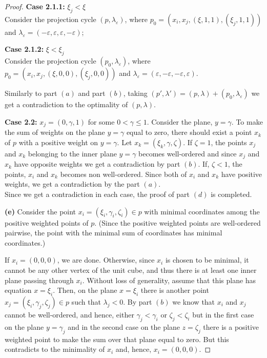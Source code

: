 \documentclass[10pt,a4paper]{amsart}
\begin{document}
\begin{proof}
    \textbf{Case 2.1.1:} \(\xi_j < \xi\)\\
    Consider the projection cycle \((p, \lambda_\varepsilon)\), where \(p_0=(x_i, x_j, (\xi,1,1), (\xi_j,1,1))\) and \(\lambda_\varepsilon=(-\varepsilon,\varepsilon,\varepsilon,-\varepsilon)\);
    
    \textbf{Case 2.1.2:} \(\xi < \xi_j\)\\
    Consider the projection cycle \((p_0, \lambda_\varepsilon)\), where \(p_0=(x_i, x_j, (\xi,0,0), (\xi_j,0,0))\) and \(\lambda_\varepsilon=(\varepsilon,-\varepsilon,-\varepsilon,\varepsilon)\).

    Similarly to part \((a)\) and part \((b)\), taking \((p',\lambda')=(p,\lambda)+(p_0,\lambda_\varepsilon)\) we get a contradiction to the optimality of \((p,\lambda)\).
    
    \textbf{Case 2.2:} \(x_j=(0,\gamma,1)\) for some \(0 < \gamma \le 1\). 
    Consider the plane, \(y=\gamma\). To make the sum of weights on the plane \(y=\gamma\) equal to zero, there should exist a point \(x_k\) of \(p\) with a positive weight on \(y=\gamma\). Let \(x_k=(\xi_k,\gamma,\zeta)\). If \(\zeta=1\), the points \(x_j\) and \(x_k\) belonging to the inner plane \(y=\gamma\) becomes well-ordered and since \(x_j\) and \(x_k\) have opposite weights we get a contradiction by part \((b)\). If, \(\zeta<1\), the points, \(x_i\) and \(x_k\) becomes non well-ordered. Since both of \(x_i\) and \(x_k\) have positive weights, we get a contradiction by the part \((a)\).
    \\
    Since we get a contradiction in each case, the proof of part \((d)\) is completed.


\textbf{(e)} 
    Consider the point \(x_i=(\xi_i,\gamma_i,\zeta_i)\in p\) with minimal coordinates among the positive weighted points of \(p\). (Since the positive weighted points are well-ordered pairwise, the point with the minimal sum of coordinates has minimal coordinates.) 
    
    If \(x_i=(0,0,0)\), we are done. Otherwise, since \(x_i\) is chosen to be minimal, it cannot be any other vertex of the unit cube, and thus there is at least one inner plane passing through \(x_i\). 
    Without loss of generality, assume that this plane has equation \(x=\xi_i\). Then, on the plane \(x=\xi_i\) there is another point \(x_j=(\xi_i,\gamma_j,\zeta_j) \in p\) such that \(\lambda_j<0\). By part \((b)\) we know that \(x_i\) and \(x_j\) cannot be well-ordered, and hence, either \(\gamma_j<\gamma_i\) or \(\zeta_j<\zeta_i\) but in the first case on the plane \(y=\gamma_j\) and in the second case on the plane \(z=\zeta_j\) there is a positive weighted point to make the sum over that plane equal to zero. But this contradicts to the minimality of \(x_i\) and, hence, \(x_i=(0,0,0)\).


\end{proof}
\end{document}
